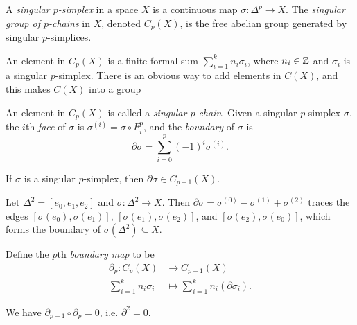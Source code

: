 \begin{definition}
  A \emph{singular $p$-simplex} in a space $X$ is a
  continuous map $\sigma : \Delta^p \to X$.
  The \emph{singular group of $p$-chains} in $X$, denoted
  $C_p(X)$, is the free abelian group generated by singular $p$-simplices.
\end{definition}

\begin{remark}
  An element in $C_p(X)$ is a
  finite formal sum $\sum_{i = 1}^k n_i \sigma_i$,
  where $n_i \in \mathbb{Z}$ and $\sigma_i$ is a singular
  $p$-simplex.
  There is an obvious way to add elements in
  $C(X)$, and this makes $C(X)$ into a group
\end{remark}

\begin{definition}
  An element in $C_p(X)$ is called a \emph{singular $p$-chain}.
  Given a singular $p$-simplex $\sigma$, the
  $i$th \emph{face} of $\sigma$ is
  $\sigma^{(i)} = \sigma \circ F_i^p$, and the
  \emph{boundary} of $\sigma$ is
  \[
    \partial \sigma = \sum_{i = 0}^p (-1)^i \sigma^{(i)}.
  \]
\end{definition}

\begin{remark}
  If $\sigma$ is a singular $p$-simplex, then
  $\partial \sigma \in C_{p - 1}(X)$.
\end{remark}

\begin{example}
  Let $\Delta^2 = [e_0, e_1, e_2]$ and
  $\sigma : \Delta^2 \to X$. Then
  $\partial \sigma = \sigma^{(0)} - \sigma^{(1)} + \sigma^{(2)}$
  traces the edges $[\sigma(e_0), \sigma(e_1)]$,
  $[\sigma(e_1), \sigma(e_2)]$, and
  $[\sigma(e_2), \sigma(e_0)]$, which forms the
  boundary of
  $\sigma(\Delta^2) \subseteq X$.
\end{example}

\begin{definition}
  Define the $p$th \emph{boundary map} to be
  \begin{align*}
    \partial_p : C_p(X) &\longrightarrow C_{p - 1}(X) \\
    \sum_{i = 1}^k n_i \sigma_i &\longmapsto \sum_{i = 1}^k n_i (\partial \sigma_i).
  \end{align*}
\end{definition}

\begin{lemma}
  We have $\partial_{p - 1} \circ \partial_p = 0$,
  i.e. $\partial^2 = 0$.
\end{lemma}

